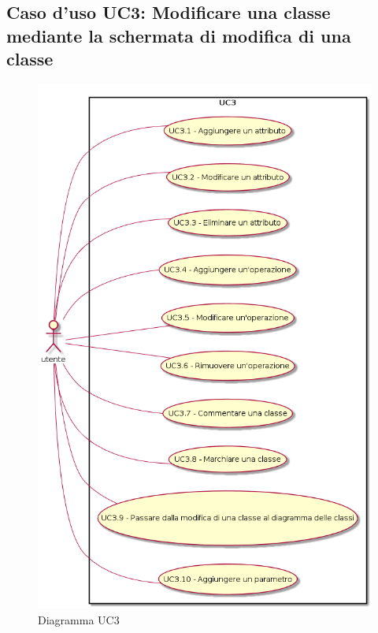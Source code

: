 \documentclass[../AnalisiDeiRequisiti.tex]{subfiles}
\begin{document}
		\subsection{Caso d'uso UC3: Modificare una classe mediante la schermata di modifica di una classe}
		\begin{figure} [H]
			\centering
			\includegraphics[scale=0.45]{./Figures/UC3.png}
			\caption{Diagramma UC3}\label{}
		\end{figure}
\end{document}
